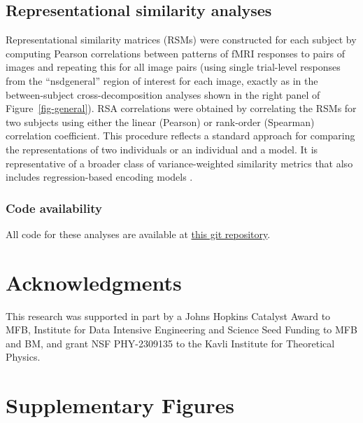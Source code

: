 \documentclass[10pt]{article}
\begin{document}
\subsection{Representational similarity
analyses}\label{representational-similarity-analyses}

Representational similarity matrices (RSMs) were constructed for each
subject by computing Pearson correlations between patterns of fMRI
responses to pairs of images and repeating this for all image pairs
(using single trial-level responses from the ``nsdgeneral'' region of
interest for each image, exactly as in the between-subject
cross-decomposition analyses shown in the right panel of
Figure~\ref{fig-general}). RSA correlations were obtained by correlating
the RSMs for two subjects using either the linear (Pearson) or
rank-order (Spearman) correlation coefficient. This procedure reflects a
standard approach for comparing the representations of two individuals
or an individual and a model. It is representative of a broader class of
variance-weighted similarity metrics that also includes regression-based
encoding models \autocite{Kriegeskorte2019,Kornblith2019}.

\subsubsection{Code availability}\label{code-availability}

All code for these analyses are available at
\href{https://github.com/BonnerLab/scale-free-visual-cortex}{this git
repository}.

\section{Acknowledgments}\label{acknowledgments}

This research was supported in part by a Johns Hopkins Catalyst Award to
MFB, Institute for Data Intensive Engineering and Science Seed Funding
to MFB and BM, and grant NSF PHY-2309135 to the Kavli Institute for
Theoretical Physics.

\newpage{}

\section*{Supplementary Figures}\label{supplementary-figures}

\setcounter{figure}{0}
\renewcommand{\thefigure}{S\arabic{figure}}
\end{document}
